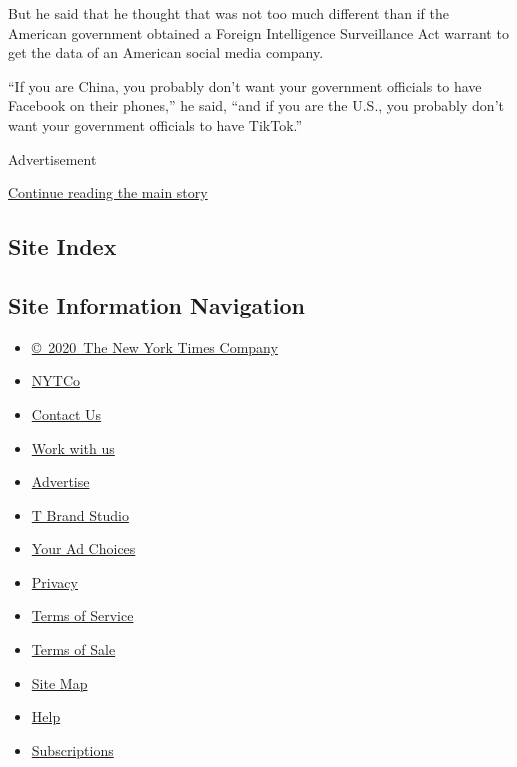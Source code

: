 But he said that he thought that was not too much different than if the
American government obtained a Foreign Intelligence Surveillance Act
warrant to get the data of an American social media company.

``If you are China, you probably don't want your government officials to
have Facebook on their phones,'' he said, ``and if you are the U.S., you
probably don't want your government officials to have TikTok.''

Advertisement

\protect\hyperlink{after-bottom}{Continue reading the main story}

\hypertarget{site-index}{%
\subsection{Site Index}\label{site-index}}

\hypertarget{site-information-navigation}{%
\subsection{Site Information
Navigation}\label{site-information-navigation}}

\begin{itemize}
\tightlist
\item
  \href{https://help.nytimes.com/hc/en-us/articles/115014792127-Copyright-notice}{©~2020~The
  New York Times Company}
\end{itemize}

\begin{itemize}
\tightlist
\item
  \href{https://www.nytco.com/}{NYTCo}
\item
  \href{https://help.nytimes.com/hc/en-us/articles/115015385887-Contact-Us}{Contact
  Us}
\item
  \href{https://www.nytco.com/careers/}{Work with us}
\item
  \href{https://nytmediakit.com/}{Advertise}
\item
  \href{http://www.tbrandstudio.com/}{T Brand Studio}
\item
  \href{https://www.nytimes.com/privacy/cookie-policy\#how-do-i-manage-trackers}{Your
  Ad Choices}
\item
  \href{https://www.nytimes.com/privacy}{Privacy}
\item
  \href{https://help.nytimes.com/hc/en-us/articles/115014893428-Terms-of-service}{Terms
  of Service}
\item
  \href{https://help.nytimes.com/hc/en-us/articles/115014893968-Terms-of-sale}{Terms
  of Sale}
\item
  \href{https://spiderbites.nytimes.com}{Site Map}
\item
  \href{https://help.nytimes.com/hc/en-us}{Help}
\item
  \href{https://www.nytimes.com/subscription?campaignId=37WXW}{Subscriptions}
\end{itemize}

